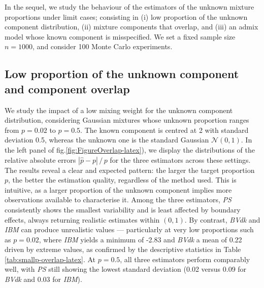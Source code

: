In the sequel, we study the behaviour of the estimators of the unknown mixture proportions under limit cases; consisting in (i) low proportion of the unknown component distribution, (ii) mixture components that overlap, and (iii) an admix model whose known component is misspecified. We set a fixed sample size \(n=1000\), and consider 100 Monte Carlo experiments.

\subsection{Low proportion of the unknown component and component overlap}\label{low-proportion-of-the-unknown-component-and-component-overlap}

We study the impact of a low mixing weight for the unknown component distribution, considering Gaussian mixtures whose unknown proportion ranges from \(p=0.02\) to \(p=0.5\). The known component is centred at 2 with standard deviation 0.5, whereas the unknown one is the standard Gaussian \(\mathcal{N}(0,1)\). In the left panel of fig.\ref{fig:FigureOverlap-latex}), we display the distributions of the relative absolute errors \(|\hat{p}-p| \, / \, p\) for the three estimators across these settings. The results reveal a clear and expected pattern: the larger the target proportion \(p\), the better the estimation quality, regardless of the method used. This is intuitive, as a larger proportion of the unknown component implies more observations available to characterise it. Among the three estimators, \emph{PS} consistently shows the smallest variability and is least affected by boundary effects, always returning realistic estimates within \((0,1)\). By contrast, \emph{BVdk} and \emph{IBM} can produce unrealistic values --- particularly at very low proportions such as \(p=0.02\), where \emph{IBM} yields a minimum of -2.83 and \emph{BVdk} a mean of 0.22 driven by extreme values, as confirmed by the descriptive statistics in Table \ref{tab:smallp-overlap-latex}. At \(p=0.5\), all three estimators perform comparably well, with \emph{PS} still showing the lowest standard deviation (0.02 versus 0.09 for \emph{BVdk} and 0.03 for \emph{IBM}).

